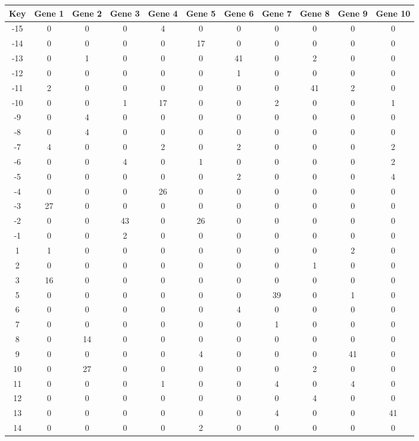 \begin{tabular}{|c|c|c|c|c|c|c|c|c|c|c|}
\hline
Key & Gene 1 & Gene 2 & Gene 3 & Gene 4 & Gene 5 & Gene 6 & Gene 7 & Gene 8 & Gene 9 & Gene 10 \\
\hline
-15 & 0 & 0 & 0 & 4 & 0 & 0 & 0 & 0 & 0 & 0 \\
-14 & 0 & 0 & 0 & 0 & 17 & 0 & 0 & 0 & 0 & 0 \\
-13 & 0 & 1 & 0 & 0 & 0 & 41 & 0 & 2 & 0 & 0 \\
-12 & 0 & 0 & 0 & 0 & 0 & 1 & 0 & 0 & 0 & 0 \\
-11 & 2 & 0 & 0 & 0 & 0 & 0 & 0 & 41 & 2 & 0 \\
-10 & 0 & 0 & 1 & 17 & 0 & 0 & 2 & 0 & 0 & 1 \\
-9 & 0 & 4 & 0 & 0 & 0 & 0 & 0 & 0 & 0 & 0 \\
-8 & 0 & 4 & 0 & 0 & 0 & 0 & 0 & 0 & 0 & 0 \\
-7 & 4 & 0 & 0 & 2 & 0 & 2 & 0 & 0 & 0 & 2 \\
-6 & 0 & 0 & 4 & 0 & 1 & 0 & 0 & 0 & 0 & 2 \\
-5 & 0 & 0 & 0 & 0 & 0 & 2 & 0 & 0 & 0 & 4 \\
-4 & 0 & 0 & 0 & 26 & 0 & 0 & 0 & 0 & 0 & 0 \\
-3 & 27 & 0 & 0 & 0 & 0 & 0 & 0 & 0 & 0 & 0 \\
-2 & 0 & 0 & 43 & 0 & 26 & 0 & 0 & 0 & 0 & 0 \\
-1 & 0 & 0 & 2 & 0 & 0 & 0 & 0 & 0 & 0 & 0 \\
1 & 1 & 0 & 0 & 0 & 0 & 0 & 0 & 0 & 2 & 0 \\
2 & 0 & 0 & 0 & 0 & 0 & 0 & 0 & 1 & 0 & 0 \\
3 & 16 & 0 & 0 & 0 & 0 & 0 & 0 & 0 & 0 & 0 \\
5 & 0 & 0 & 0 & 0 & 0 & 0 & 39 & 0 & 1 & 0 \\
6 & 0 & 0 & 0 & 0 & 0 & 4 & 0 & 0 & 0 & 0 \\
7 & 0 & 0 & 0 & 0 & 0 & 0 & 1 & 0 & 0 & 0 \\
8 & 0 & 14 & 0 & 0 & 0 & 0 & 0 & 0 & 0 & 0 \\
9 & 0 & 0 & 0 & 0 & 4 & 0 & 0 & 0 & 41 & 0 \\
10 & 0 & 27 & 0 & 0 & 0 & 0 & 0 & 2 & 0 & 0 \\
11 & 0 & 0 & 0 & 1 & 0 & 0 & 4 & 0 & 4 & 0 \\
12 & 0 & 0 & 0 & 0 & 0 & 0 & 0 & 4 & 0 & 0 \\
13 & 0 & 0 & 0 & 0 & 0 & 0 & 4 & 0 & 0 & 41 \\
14 & 0 & 0 & 0 & 0 & 2 & 0 & 0 & 0 & 0 & 0 \\
\hline
\end{tabular}